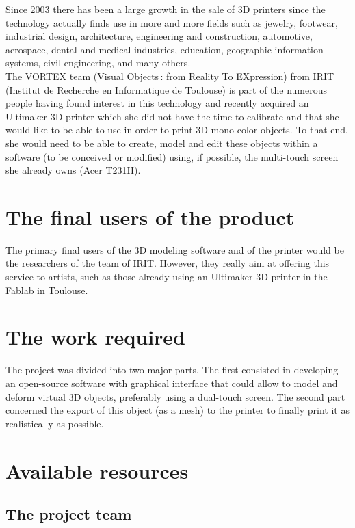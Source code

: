 \documentclass{report}
\begin{document}
	Since 2003 there has been a large growth in the sale of 3D printers since the technology actually finds use in more and more fields such as jewelry, footwear, industrial design, architecture, engineering and construction, automotive, aerospace, dental and medical industries, education, geographic information systems, civil engineering, and many others.\\

	The VORTEX team (Visual Objects : from Reality To EXpression) from IRIT (Institut de Recherche en Informatique de Toulouse) is part of the numerous people having found interest in this technology and recently acquired an Ultimaker 3D printer which she did not have the time to calibrate and that she would like to be able to use in order to print 3D mono-color objects. To that end, she would need to be able to create, model and edit these objects within a software (to be conceived or modified) using, if possible, the multi-touch screen she already owns (Acer T231H).\\

\section{The final users of the product}

	The primary final users of the 3D modeling software and of the printer would be the researchers of the team of IRIT. However, they really aim at offering this service to artists, such as those already using an Ultimaker 3D printer in the Fablab in Toulouse.

\section{The work required}

	The project was divided into two major parts. The first consisted in developing an open-source software with graphical interface that could allow to model and deform virtual 3D objects, preferably using a dual-touch screen. The second part concerned the export of this object (as a mesh) to the printer to finally print it as realistically as possible.

\section{Available resources}

\subsection{The project team}
\end{document}
